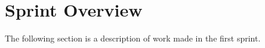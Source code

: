 \section{Sprint Overview}

The following section is a description of work made in the first sprint.



